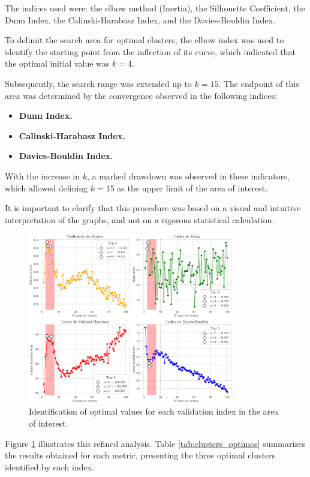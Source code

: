 \documentclass[10pt]{article}
\begin{document}
The indices used were: the elbow method (Inertia), the Silhouette Coefficient, the Dunn Index, the Calinski-Harabasz Index, and the Davies-Bouldin Index.

To delimit the search area for optimal clusters, the elbow index was used to identify the starting point from the inflection of its curve, which indicated that the optimal initial value was \( k = 4 \).

Subsequently, the search range was extended up to \( k = 15 \). The endpoint of this area was determined by the convergence observed in the following indices:
\begin{itemize}
    \item \textbf{Dunn Index.}
    \item \textbf{Calinski-Harabasz Index.}
    \item \textbf{Davies-Bouldin Index.}
\end{itemize}

With the increase in \( k \), a marked drawdown was observed in these indicators, which allowed defining \( k = 15 \) as the upper limit of the area of interest.

It is important to clarify that this procedure was based on a visual and intuitive interpretation of the graphs, and not on a rigorous statistical calculation.

\begin{figure}[h]
    \centering
    \includegraphics[width=0.8\textwidth]{plots_investing/Grafico 7.png}
    \caption{Identification of optimal values for each validation index in the area of interest.}
    \label{fig:miGrafico7}
\end{figure}

Figure \ref{fig:miGrafico7} illustrates this refined analysis. Table \ref{tab:clusters_optimos} summarizes the results obtained for each metric, presenting the three optimal clusters identified by each index.
\end{document}

